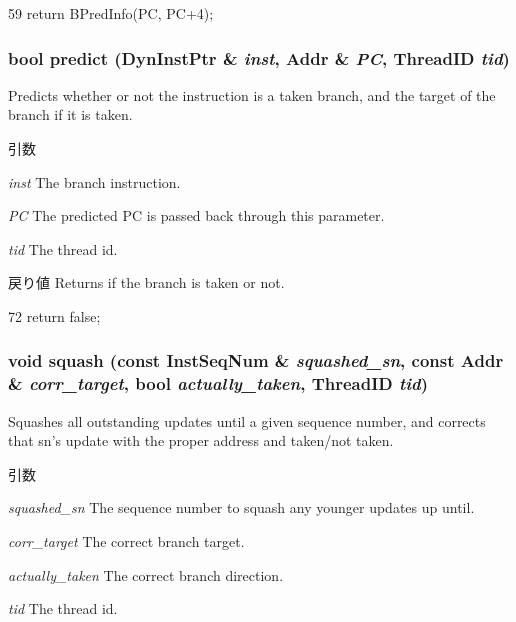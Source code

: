 \begin{DoxyCode}
59 { return BPredInfo(PC, PC+4); }
\end{DoxyCode}
\hypertarget{classNullPredictor_a7a7d352690772cc95f76b54aaed742db}{
\subsubsection[{predict}]{\setlength{\rightskip}{0pt plus 5cm}bool predict ({\bf DynInstPtr} \& {\em inst}, \/  {\bf Addr} \& {\em PC}, \/  {\bf ThreadID} {\em tid})}}
\label{classNullPredictor_a7a7d352690772cc95f76b54aaed742db}
Predicts whether or not the instruction is a taken branch, and the target of the branch if it is taken. 
\begin{DoxyParams}{引数}
\item[{\em inst}]The branch instruction. \item[{\em PC}]The predicted PC is passed back through this parameter. \item[{\em tid}]The thread id. \end{DoxyParams}
\begin{DoxyReturn}{戻り値}
Returns if the branch is taken or not. 
\end{DoxyReturn}



\begin{DoxyCode}
72     { return false; }
\end{DoxyCode}
\hypertarget{classNullPredictor_a61d0d996b2d1380dca7322d0b627daf5}{
\subsubsection[{squash}]{\setlength{\rightskip}{0pt plus 5cm}void squash (const {\bf InstSeqNum} \& {\em squashed\_\-sn}, \/  const {\bf Addr} \& {\em corr\_\-target}, \/  bool {\em actually\_\-taken}, \/  {\bf ThreadID} {\em tid})}}
\label{classNullPredictor_a61d0d996b2d1380dca7322d0b627daf5}
Squashes all outstanding updates until a given sequence number, and corrects that sn's update with the proper address and taken/not taken. 
\begin{DoxyParams}{引数}
\item[{\em squashed\_\-sn}]The sequence number to squash any younger updates up until. \item[{\em corr\_\-target}]The correct branch target. \item[{\em actually\_\-taken}]The correct branch direction. \item[{\em tid}]The thread id. \end{DoxyParams}



